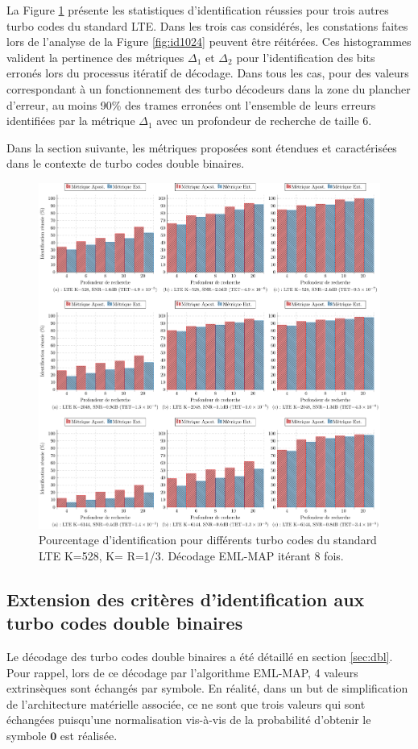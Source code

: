 \newpage
La Figure \ref{fig:idLTE} présente les statistiques d'identification réussies pour trois autres turbo codes du standard 
LTE. Dans les trois cas considérés, les constations faites lors de l'analyse de la Figure \ref{fig:id1024} peuvent être 
réitérées. Ces histogrammes valident la pertinence des métriques $\Delta_1$ et $\Delta_2$ pour l'identification des bits 
erronés lors du processus itératif de décodage. Dans tous les cas, pour des valeurs correspondant à un fonctionnement des 
turbo décodeurs dans la zone du plancher d'erreur, au moins 90\% des trames erronées ont l'ensemble de leurs erreurs 
identifiées par la métrique $\Delta_1$ avec un profondeur de recherche de taille 6.

Dans la section suivante, les métriques proposées sont étendues et caractérisées dans le contexte de turbo codes double 
binaires.

\begin{figure}[!h]
	\centering
	\hspace*{-1cm}
	\includegraphics[width=1.05\textwidth]{main/ch3_fig/id2/tikz/lte.pdf}
	\caption{Pourcentage d'identification pour différents turbo codes du standard LTE K=528, K= R=1/3.
	Décodage EML-MAP itérant 8 fois. \label{fig:idLTE}}
\end{figure}

\subsection{Extension des critères d'identification aux turbo codes double binaires}
Le décodage des turbo codes double binaires a été détaillé en section \ref{sec:dbl}. Pour rappel, lors de ce décodage par
l'algorithme EML-MAP, 4 valeurs extrinsèques sont échangés par symbole. En réalité, dans un but de simplification de 
l'architecture matérielle associée, ce ne sont que trois valeurs qui sont échangées puisqu'une normalisation vis-à-vis de 
la probabilité d'obtenir le symbole $\mathbf{0}$ est réalisée. 


